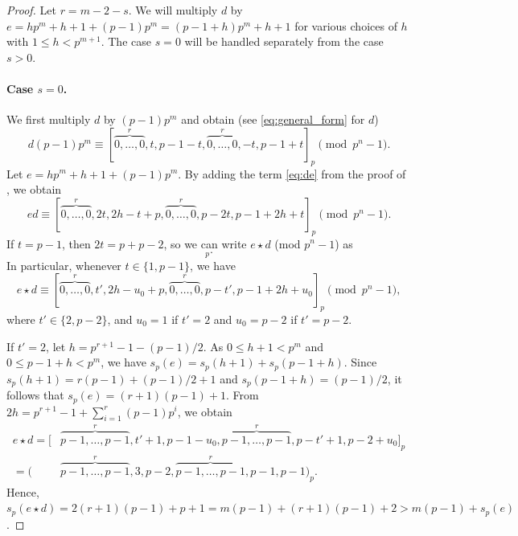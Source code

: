 \documentclass[10pt,a4paper]{amsart}
\newcommand{\wt}{s_p}
\begin{document}
\begin{proof}
Let $r = m - 2 - s$.
We will multiply $d$ by $e = hp^m + h+1 + (p-1)p^m = (p-1+h)p^m + h+1$ for various choices of $h$ with $1 \leq h < p^{m+1}$.
The case $s = 0$ will be handled separately from the case $s > 0$.

\paragraph{Case $s=0$.} 
We first multiply $d$ by $(p-1)p^m$ and obtain (see \eqref{eq:general_form} for $d$)
\begin{equation*}
d (p-1)p^m \equiv [\overbrace{0,\dots,0}^r,t,p-1-t,\overbrace{0,\dots,0}^r,-t,p-1+t]_p \pmod{p^n-1}.
\end{equation*}
Let $e = hp^m + h+1 + (p-1)p^m$. By adding the term \eqref{eq:de} from the proof of , we obtain 
\begin{equation*}
    ed \equiv [\overbrace{0,\dots,0}^r,2t, 2h-t+p,\overbrace{0,\dots,0}^r,p-2t, p-1+2h+t]_p \pmod{p^n-1}.
\end{equation*}
If $t = p-1$, then $2t = p + p-2$, so we can write $e \star d$ (mod $p^n-1$) as
\begin{equation*}
    [\overbrace{0,\dots,0}^r,p-2, 2h+2,\overbrace{0,\dots,0}^r,2, p-2+2h+p-1]_p.
\end{equation*}
In particular, whenever $t \in \{1,p-1\}$, we have
\begin{equation*}
    e \star d \equiv [\overbrace{0,\dots,0}^r,t', 2h-u_0+p,\overbrace{0,\dots,0}^r,p-t', p-1+2h+u_0]_p \pmod {p^n-1},
\end{equation*}
where $t' \in \{2,p-2\}$, and $u_0 = 1$ if $t' = 2$ and $u_0 = p - 2$ if $t' = p - 2$.

If $t' = 2$, let $h = p^{r + 1} - 1 - (p - 1)/2$. As $0 \leq h+1 <p^m$ and $0 \leq p-1+h <p^m$, we have $\wt(e) = \wt(h+1) + \wt(p-1+h)$. Since $\wt(h + 1) = r(p-1) + (p - 1)/2 + 1$ and $\wt(p - 1+ h) =  (p - 1)/2$, it follows that $\wt(e) = (r + 1)(p - 1) + 1$.
From $2h = p^{r + 1} - 1 + \sum_{i = 1}^r (p - 1)p^i$, we obtain
\begin{align*}
e \star d = [&\overbrace{p-1,\dots,p-1}^r,t'+1, p-1-u_0,\overbrace{p-1,\dots,p-1}^r,p-t'+1, p-2+u_0]_p \\
= (&\overbrace{p-1,\dots,p-1}^r,3, p-2,\overbrace{p-1,\dots,p-1}^r,p-1, p-1)_p.
\end{align*}
Hence, $\wt(e \star d) = 2(r+1)(p-1) + p+1 = m(p-1) + (r+1)(p-1) + 2 > m(p - 1) + \wt(e)$.


\end{proof}
\end{document}
